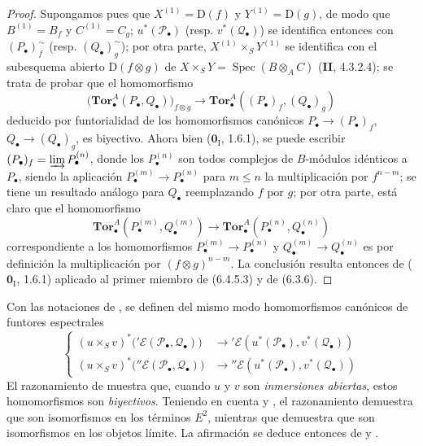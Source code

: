 \begin{proof}
Supongamos pues que $X^{(1)}=\mathrm D(f)$ y $Y^{(1)}=\mathrm D(g)$, de modo
que $B^{(1)}=B_f$ y $C^{(1)}=C_g$; $u^*(\mathscr P_\bullet)$ (resp.
$v^*(\mathscr Q_\bullet)$) se identifica entonces con
$(P_\bullet)_f^{\sim}$ (resp. $(Q_\bullet)_g^{\sim}$); por otra parte,
$X^{(1)}\times_S Y^{(1)}$ se identifica con el subesquema abierto
$\mathrm D(f\otimes g)$ de
$X\times_S Y=\operatorname{Spec}(B\otimes_A C)$ (\textbf{II}, 4.3.2.4); se trata de
probar que el homomorfismo
\[
  \bigl(\mathbf{Tor}_\bullet^A(P_\bullet,Q_\bullet)\bigr)_{f\otimes g}
  \longrightarrow
  \mathbf{Tor}_\bullet^A((P_\bullet)_f,(Q_\bullet)_g)
  \tag{6.4.5.3}\label{III.6.4.5.3.fr}
\]
deducido por funtorialidad de los homomorfismos canónicos
$P_\bullet\to(P_\bullet)_f$, $Q_\bullet\to(Q_\bullet)_g$, es biyectivo. Ahora bien
($\mathbf{0}_{\mathrm I}$, 1.6.1), se puede escribir
$(P_\bullet)_f=\varinjlim P_\bullet^{(n)}$, donde los $P_\bullet^{(n)}$ son todos
complejos de $B$-módulos idénticos a $P_\bullet$, siendo la aplicación
$P_\bullet^{(m)}\to P_\bullet^{(n)}$ para $m\leqslant n$ la
multiplicación por $f^{n-m}$; se tiene un resultado análogo para $Q_\bullet$
reemplazando $f$ por $g$; por otra parte, está claro que el homomorfismo
\[
  \mathbf{Tor}_\bullet^A(P_\bullet^{(m)},Q_\bullet^{(m)})
  \longrightarrow
  \mathbf{Tor}_\bullet^A(P_\bullet^{(n)},Q_\bullet^{(n)})
\]
correspondiente a los homomorfismos
$P_\bullet^{(m)}\to P_\bullet^{(n)}$ y
$Q_\bullet^{(m)}\to Q_\bullet^{(n)}$ es por definición la multiplicación
por $(f\otimes g)^{n-m}$. La conclusión resulta entonces de ($\mathbf{0}_{\mathrm I}$,
1.6.1) aplicado al primer miembro de (6.4.5.3) y de (6.3.6).
\end{proof}

\begin{env}[6.4.6]
\label{III.6.4.6}
Con las notaciones de , se definen del mismo modo
homomorfismos canónicos de funtores espectrales
\[
  \left\{
  \begin{aligned}
  (u\times_S v)^*\bigl('\mathscr E(\mathscr P_\bullet,\mathscr Q_\bullet)\bigr)
    &\longrightarrow
      '\mathscr E(u^*(\mathscr P_\bullet),v^*(\mathscr Q_\bullet))\\
  (u\times_S v)^*\bigl(''\mathscr E(\mathscr P_\bullet,\mathscr Q_\bullet)\bigr)
    &\longrightarrow
      ''\mathscr E(u^*(\mathscr P_\bullet),v^*(\mathscr Q_\bullet))
  \end{aligned}
  \right.
  \tag{6.4.6.1}\label{III.6.4.6.1.fr}
\]
El razonamiento de  muestra que, cuando $u$ y $v$
son \emph{inmersiones abiertas}, estos homomorfismos son \emph{biyectivos}.
Teniendo en cuenta  y , el
razonamiento demuestra que son isomorfismos en los términos $E^2$,
mientras que  demuestra que son isomorfismos en los
objetos límite. La afirmación se deduce entonces de
 y .
\end{env}
